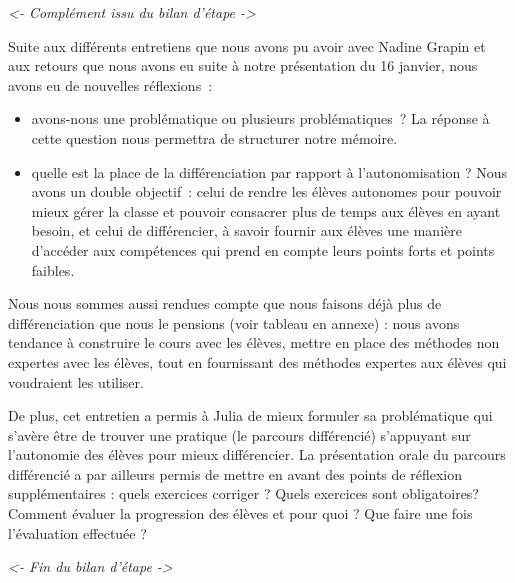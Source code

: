 \textit{<- Complément issu du bilan d'étape ->}

Suite aux différents entretiens que nous avons pu avoir avec Nadine Grapin et aux retours que nous avons eu suite à notre présentation du 16 janvier, nous avons eu de nouvelles réflexions : 
\begin{itemize}
    \item avons-nous une problématique ou plusieurs problématiques ? La réponse à cette question nous permettra de structurer notre mémoire.
    \item quelle est la place de la différenciation par rapport à l’autonomisation ? Nous avons un double objectif : celui de rendre les élèves autonomes pour pouvoir mieux gérer la classe et pouvoir consacrer plus de temps aux élèves en ayant besoin, et celui de différencier, à savoir fournir aux élèves une manière d’accéder aux compétences qui prend en compte leurs points forts et points faibles.
\end{itemize}
    
Nous nous sommes aussi rendues compte que nous faisons déjà plus de différenciation que nous le pensions (voir tableau en annexe) : nous avons tendance à construire le cours avec les élèves, mettre en place des méthodes non expertes avec les élèves, tout en fournissant des méthodes expertes aux élèves qui voudraient les utiliser.

De plus, cet entretien a permis à Julia de mieux formuler sa problématique qui s’avère être de trouver une pratique (le parcours différencié) s’appuyant sur l’autonomie des élèves pour mieux différencier. La présentation orale du parcours différencié a par ailleurs permis de mettre en avant des points de réflexion supplémentaires : quels exercices corriger ? Quels exercices sont obligatoires? Comment évaluer la progression des élèves et pour quoi ? Que faire une fois l’évaluation effectuée ?

\textit{<- Fin du bilan d'étape ->}